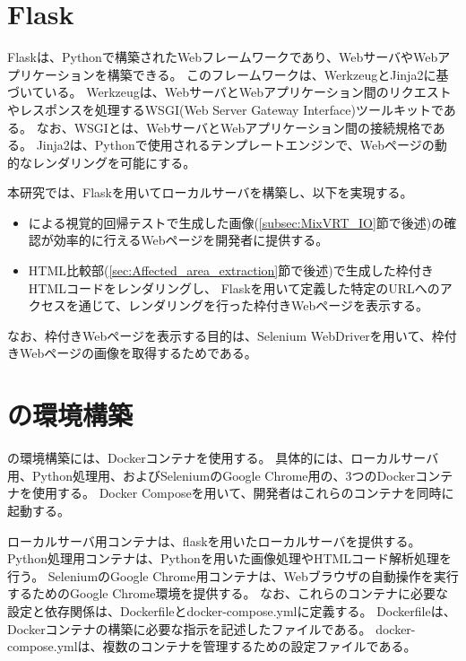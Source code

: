 
\section{Flask}\label{sec:Flask}
Flask\cite{Flask}は、Pythonで構築されたWebフレームワークであり、WebサーバやWebアプリケーションを構築できる。
このフレームワークは、Werkzeug\cite{Werkzeug}とJinja2\cite{Jinja}に基づいている。
Werkzeugは、WebサーバとWebアプリケーション間のリクエストやレスポンスを処理するWSGI(Web Server Gateway Interface)ツールキットである。
なお、WSGI\cite{WSGI}とは、WebサーバとWebアプリケーション間の接続規格である。
Jinja2は、Pythonで使用されるテンプレートエンジン\cite{TemplateEngine}で、Webページの動的なレンダリングを可能にする。
\par
本研究では、Flaskを用いてローカルサーバを構築し、以下を実現する。
\begin{itemize}
      \setlength{\itemsep}{0pt}
            \setlength{\parsep}{0pt}
      \item \toolName による視覚的回帰テストで生成した画像(\ref{subsec:MixVRT_IO}節で後述)の確認が効率的に行えるWebページを開発者に提供する。
      \item HTML比較部(\ref{sec:Affected_area_extraction}節で後述)で生成した枠付きHTMLコードをレンダリングし、
            Flaskを用いて定義した特定のURLへのアクセスを通じて、レンダリングを行った枠付きWebページを表示する。
\end{itemize}
なお、枠付きWebページを表示する目的は、Selenium WebDriverを用いて、枠付きWebページの画像を取得するためである。

\section{\toolName の環境構築}\label{sec:MixVRT_env_gen}
\toolName の環境構築には、Dockerコンテナ\cite{DockerContainer}を使用する。
具体的には、ローカルサーバ用、Python処理用、およびSeleniumのGoogle Chrome用の、3つのDockerコンテナ\cite{DockerContainer}を使用する。
Docker Compose\cite{DockerCompose}を用いて、開発者はこれらのコンテナを同時に起動する。
\par
ローカルサーバ用コンテナは、flaskを用いたローカルサーバを提供する。
Python処理用コンテナは、Pythonを用いた画像処理やHTMLコード解析処理を行う。
SeleniumのGoogle Chrome用コンテナは、Webブラウザの自動操作を実行するためのGoogle Chrome環境を提供する。
なお、これらのコンテナに必要な設定と依存関係は、Dockerfileとdocker-compose.ymlに定義する。
Dockerfileは、Dockerコンテナの構築に必要な指示を記述したファイルである。
docker-compose.ymlは、複数のコンテナを管理するための設定ファイルである。

